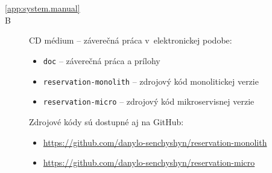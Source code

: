 
\chapter*{\appendixlistname}

\begin{description}

   \item[\autoref{app:system.manual}] 
   \item[\appendixname{} B] CD médium -- záverečná práca v~elektronickej podobe:
   \begin{itemize}
    \item \texttt{doc} -- záverečná práca a prílohy
    \item \texttt{reservation-monolith} -- zdrojový kód monolitickej verzie
    \item \texttt{reservation-micro} -- zdrojový kód mikroservisnej verzie
   \end{itemize}
   \begin{sloppypar}
   Zdrojové kódy sú dostupné aj na GitHub:
   \begin{itemize}
    \item \url{https://github.com/danylo-senchyshyn/reservation-monolith}
    \item \url{https://github.com/danylo-senchyshyn/reservation-micro}
   \end{itemize}
   \end{sloppypar}

\end{description}

